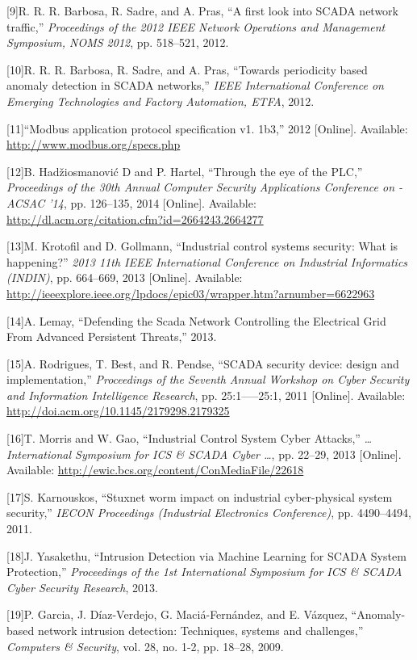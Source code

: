 \documentclass[11pt,]{article}
\begin{document}
{[}9{]}R. R. R. Barbosa, R. Sadre, and A. Pras, ``A first look into
SCADA network traffic,'' \emph{Proceedings of the 2012 IEEE Network
Operations and Management Symposium, NOMS 2012}, pp. 518--521, 2012.

{[}10{]}R. R. R. Barbosa, R. Sadre, and A. Pras, ``Towards periodicity
based anomaly detection in SCADA networks,'' \emph{IEEE International
Conference on Emerging Technologies and Factory Automation, ETFA}, 2012.

{[}11{]}``Modbus application protocol specification v1. 1b3,'' 2012
{[}Online{]}. Available: \url{http://www.modbus.org/specs.php}

{[}12{]}B. Hadžiosmanović D and P. Hartel, ``Through the eye of the
PLC,'' \emph{Proceedings of the 30th Annual Computer Security
Applications Conference on - ACSAC '14}, pp. 126--135, 2014
{[}Online{]}. Available:
\url{http://dl.acm.org/citation.cfm?id=2664243.2664277}

{[}13{]}M. Krotofil and D. Gollmann, ``Industrial control systems
security: What is happening?'' \emph{2013 11th IEEE International
Conference on Industrial Informatics (INDIN)}, pp. 664--669, 2013
{[}Online{]}. Available:
\url{http://ieeexplore.ieee.org/lpdocs/epic03/wrapper.htm?arnumber=6622963}

{[}14{]}A. Lemay, ``Defending the Scada Network Controlling the
Electrical Grid From Advanced Persistent Threats,'' 2013.

{[}15{]}A. Rodrigues, T. Best, and R. Pendse, ``SCADA security device:
design and implementation,'' \emph{Proceedings of the Seventh Annual
Workshop on Cyber Security and Information Intelligence Research}, pp.
25:1-----25:1, 2011 {[}Online{]}. Available:
\url{http://doi.acm.org/10.1145/2179298.2179325}

{[}16{]}T. Morris and W. Gao, ``Industrial Control System Cyber
Attacks,'' \emph{\ldots{}International Symposium for ICS \& SCADA Cyber
\ldots{}}, pp. 22--29, 2013 {[}Online{]}. Available:
\url{http://ewic.bcs.org/content/ConMediaFile/22618}

{[}17{]}S. Karnouskos, ``Stuxnet worm impact on industrial
cyber-physical system security,'' \emph{IECON Proceedings (Industrial
Electronics Conference)}, pp. 4490--4494, 2011.

{[}18{]}J. Yasakethu, ``Intrusion Detection via Machine Learning for
SCADA System Protection,'' \emph{Proceedings of the 1st International
Symposium for ICS \& SCADA Cyber Security Research}, 2013.

{[}19{]}P. Garcia, J. Díaz-Verdejo, G. Maciá-Fernández, and E. Vázquez,
``Anomaly-based network intrusion detection: Techniques, systems and
challenges,'' \emph{Computers \& Security}, vol. 28, no. 1-2, pp.
18--28, 2009.
\end{document}
